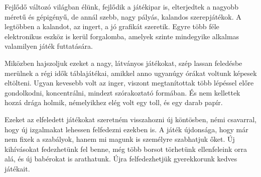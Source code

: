 



Fejlődő változó világban élünk, fejlődik a játékipar is, elterjedtek a nagyobb méretű és gépigényű, de annál szebb, nagy pályás, kalandos szerepjátékok. A legtöbben a kalandot, az ingert, a jó grafikát szeretik. Egyre több féle elektronikus eszköz is kerül forgalomba, amelyek szinte mindegyike alkalmas valamilyen játék futtatására.

Miközben hajszoljuk ezeket a nagy, látványos játékokat, szép lassan feledésbe merülnek a régi idők táblajátékai, amikkel anno ugyanúgy órákat voltunk képesek eltölteni. Ugyan kevesebb volt az inger, viszont megtanítottak több lépéssel előre gondolkodni, koncentrálni, mindezt szórakoztató formában. És nem kellettek hozzá drága holmik, némelyikhez elég volt egy toll, és egy darab papír.

Ezeket az elfeledett játékokat szeretném visszahozni új köntösben, némi csavarral, hogy új izgalmakat lehessen felfedezni ezekben is. A játék újdonsága, hogy már nem fixek a szabályok, hanem mi magunk is személyre szabhatjuk őket. Új kihívásokat fedezhetünk fel benne, még több borsot törhetünk ellenfeleink orra alá, és új babérokat is arathatunk. Újra felfedezhetjük gyerekkorunk kedves játékait.